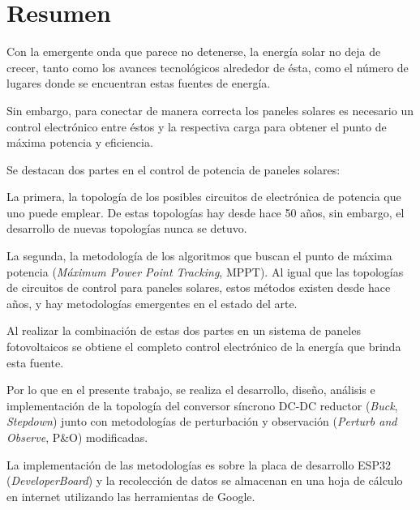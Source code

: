 \setcounter{page}{1}
\chapter*{Resumen}
\patchcmd{\chapter}
  {\clearpage}
  {\cleardoublepage}
  {}
  {}
Con la emergente onda que parece no detenerse, la energía solar no deja de crecer, tanto como los avances tecnológicos alrededor de ésta, como el número de lugares donde se encuentran estas fuentes de energía. 

Sin embargo, para conectar de manera correcta los paneles solares es necesario un control electrónico entre éstos y la respectiva carga para obtener el punto de máxima potencia y eficiencia. 

Se destacan dos partes en el control de potencia de paneles solares:

La primera, la topología de los posibles circuitos de electrónica de potencia que uno puede emplear. De estas topologías hay desde hace 50 años, sin embargo, el desarrollo de nuevas topologías nunca se detuvo.

La segunda, la metodología de los algoritmos que buscan el punto de máxima potencia (\textit{Máximum Power Point Tracking}, MPPT). Al igual que las topologías de circuitos de control para paneles solares, estos métodos existen desde hace años, y hay metodologías emergentes en el estado del arte.

Al realizar la combinación de estas dos partes en un sistema de paneles fotovoltaicos se obtiene el completo control electrónico de la energía que brinda esta fuente.

Por lo que en el presente trabajo, se realiza el desarrollo, diseño, análisis e implementación de la topología del conversor síncrono DC-DC reductor (\textit{Buck}, \textit{Stepdown}) junto con metodologías de perturbación y observación (\textit{Perturb and Observe}, P\&O) modificadas.

La implementación de las metodologías es sobre la placa de desarrollo ESP32 (\textit{DeveloperBoard}) y la recolección de datos se almacenan en una hoja de cálculo en internet utilizando las herramientas de Google.    

